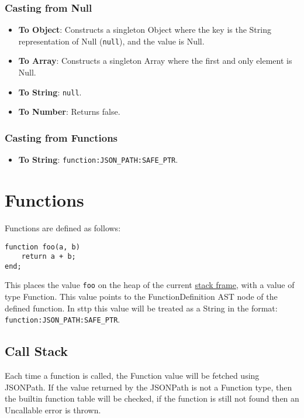 \subsubsection{Casting from Null}

\begin{itemize}
    \item \textbf{To Object}: Constructs a singleton Object where the key is the String representation of Null (\verb|null|), and the value is Null.
    \item \textbf{To Array}: Constructs a singleton Array where the first and only element is Null.
    \item \textbf{To String}: \verb|null|.
    \item \textbf{To Number}: Returns false.
\end{itemize}

\subsubsection{Casting from Functions}

\begin{itemize}
    \item \textbf{To String}: \verb|function:JSON_PATH:SAFE_PTR|.
\end{itemize}

\section{Functions}

Functions are defined as follows:

\begin{verbatim}
function foo(a, b)
    return a + b;
end;
\end{verbatim}

This places the value \verb|foo| on the heap of the current \hyperref[sec:function-call-stack]{stack frame}, with a value of type Function. This value points to the FunctionDefinition AST node of the defined function. In sttp this value will be treated as a String in the format: \verb|function:JSON_PATH:SAFE_PTR|.

\subsection{Call Stack}
\label{sec:function-call-stack}

Each time a function is called, the Function value will be fetched using JSONPath. If the value returned by the JSONPath is not a Function type, then the builtin function table will be checked, if the function is still not found then an Uncallable error is thrown.

